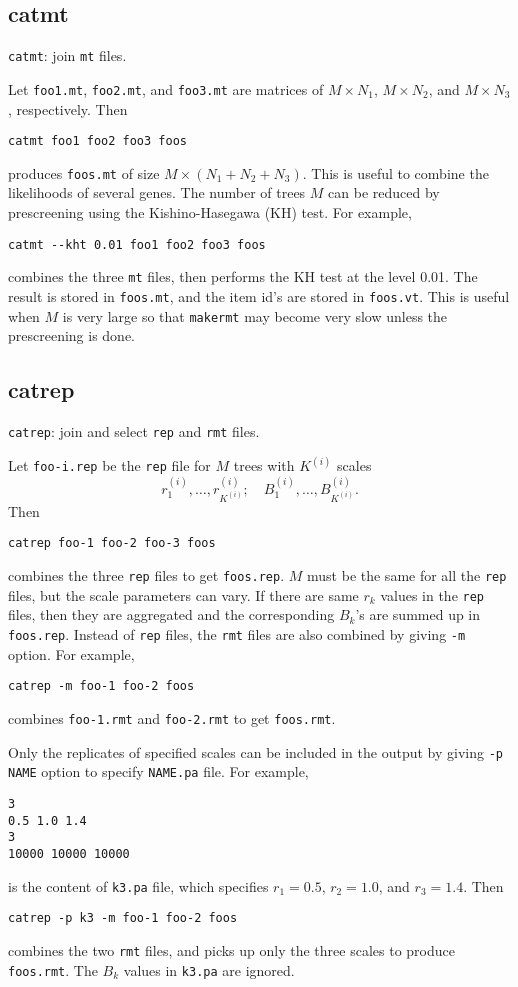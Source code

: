 \documentclass[12pt]{article}
\begin{document}
\subsection{catmt}

{\tt catmt}: join {\tt mt} files.

Let {\tt foo1.mt}, {\tt foo2.mt}, and {\tt foo3.mt} are matrices of
$M\times N_1$, $M\times N_2$, and $M\times N_3$, respectively. Then
\begin{verbatim}
catmt foo1 foo2 foo3 foos	
\end{verbatim}
produces {\tt foos.mt} of size $M\times (N_1+N_2+N_3)$. This is useful
to combine the likelihoods of several genes. The number of trees $M$ can
be reduced by prescreening using the Kishino-Hasegawa (KH) test. For
example,
\begin{verbatim}
catmt --kht 0.01 foo1 foo2 foo3 foos	
\end{verbatim}
combines the three {\tt mt} files, then performs the KH test at the
level 0.01. The result is stored in {\tt foos.mt}, and the item id's are
stored in {\tt foos.vt}. This is useful when $M$ is very large so that
{\tt makermt} may become very slow unless the prescreening is done.


\subsection{catrep}

{\tt catrep}: join and select {\tt rep} and {\tt rmt} files.
\bigskip

Let {\tt foo-i.rep} be the {\tt rep} file for $M$ trees with $K^{(i)}$
scales
\[
r^{(i)}_1,\ldots,r^{(i)}_{K^{(i)}};\quad
B^{(i)}_1,\ldots,B^{(i)}_{K^{(i)}}.
\]
Then
\begin{verbatim}
catrep foo-1 foo-2 foo-3 foos
\end{verbatim}
combines the three {\tt rep} files to get {\tt foos.rep}. $M$ must be
the same for all the {\tt rep} files, but the scale parameters can
vary. If there are same $r_k$ values in the {\tt rep} files, then they
are aggregated and the corresponding $B_k$'s are summed up in {\tt
foos.rep}. Instead of {\tt rep} files, the {\tt rmt} files are also
combined by giving {\tt -m} option. For example,
\begin{verbatim}
catrep -m foo-1 foo-2 foos
\end{verbatim}
combines {\tt foo-1.rmt} and {\tt foo-2.rmt} to get {\tt foos.rmt}.

Only the replicates of specified scales can be included in the output by
giving {\tt -p NAME} option to specify {\tt NAME.pa} file. For example,
\begin{verbatim}
3
0.5 1.0 1.4
3
10000 10000 10000
\end{verbatim}
is the content of {\tt k3.pa} file, which specifies $r_1=0.5$,
$r_2=1.0$, and $r_3=1.4$. Then
\begin{verbatim}
catrep -p k3 -m foo-1 foo-2 foos
\end{verbatim}
combines the two {\tt rmt} files, and picks up only the three scales to
produce {\tt foos.rmt}. The $B_k$ values in {\tt k3.pa} are ignored.
\end{document}
